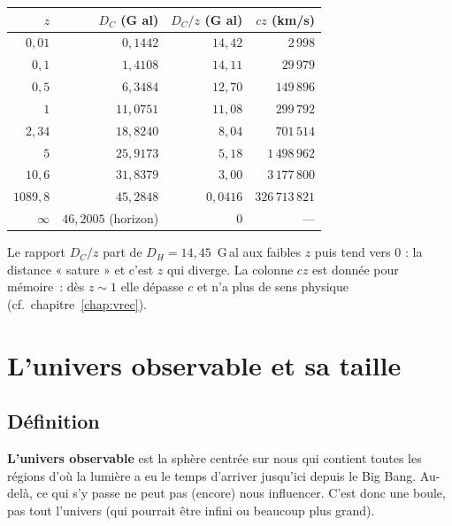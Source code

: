 \documentclass[11pt,a4paper,openany]{report}
\begin{document}
\begin{center}
\renewcommand{\arraystretch}{1.3}
\begin{tabular}{rrrr}
\toprule
\textbf{$z$} & \textbf{$D_C$ (G al)} & \textbf{$D_C / z$ (G al)} & \textbf{$cz$ (km/s)} \\
\midrule
$0{,}01$   & $0{,}1442$          & $14{,}42$  & $2\,998$ \\
$0{,}1$    & $1{,}4108$          & $14{,}11$  & $29\,979$ \\
$0{,}5$    & $6{,}3484$          & $12{,}70$  & $149\,896$ \\
$1$        & $11{,}0751$         & $11{,}08$  & $299\,792$ \\
$2{,}34$   & $18{,}8240$         & $8{,}04$   & $701\,514$ \\
$5$        & $25{,}9173$         & $5{,}18$   & $1\,498\,962$ \\
$10{,}6$   & $31{,}8379$         & $3{,}00$   & $3\,177\,800$ \\
$1089{,}8$ & $45{,}2848$         & $0{,}0416$ & $326\,713\,821$ \\
$\infty$   & $46{,}2005$ (horizon) & $0$      & --- \\
\bottomrule
\end{tabular}
\end{center}

\noindent Le rapport $D_C/z$ part de $D_H = 14{,}45$~G\,al aux faibles $z$
puis tend vers $0$ : la distance « sature » et c'est $z$ qui diverge.
La colonne $cz$ est donnée pour mémoire~: dès $z\sim 1$ elle dépasse $c$ et
n'a plus de sens physique (cf.\ chapitre~\ref{chap:vrec}).

\chapter{L'univers observable et sa taille}
\label{chap:observable}

\section{Définition}

\begin{tcolorbox}[vulgarisation]
\textbf{L'univers observable} est la sphère centrée sur nous qui contient
toutes les régions d'où la lumière a eu le temps d'arriver jusqu'ici depuis
le Big Bang. Au-delà, ce qui s'y passe ne peut pas (encore) nous influencer.
C'est donc une boule, pas tout l'univers (qui pourrait être infini ou
beaucoup plus grand).
\end{tcolorbox}
\end{document}
